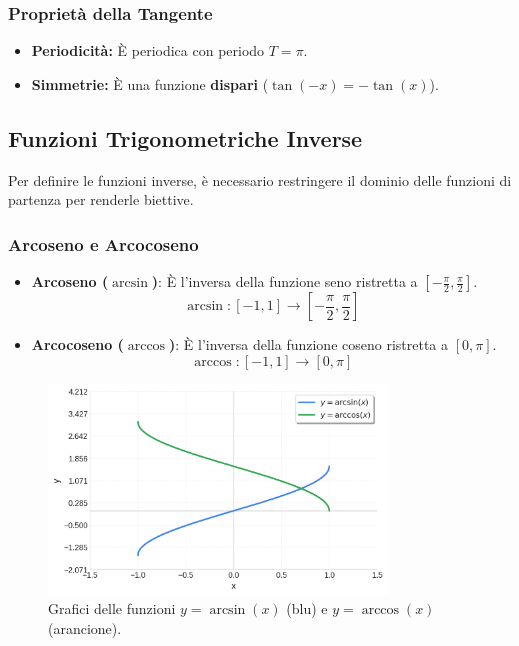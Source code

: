 \subsubsection{Proprietà della Tangente}
\begin{itemize}
    \item \textbf{Periodicità:} È periodica con periodo \(T = \pi\).
    \item \textbf{Simmetrie:} È una funzione \textbf{dispari} (\(\tan(-x) = -\tan(x)\)).
\end{itemize}

\subsection{Funzioni Trigonometriche Inverse}
Per definire le funzioni inverse, è necessario restringere il dominio delle funzioni di partenza per renderle biettive.

\subsubsection{Arcoseno e Arcocoseno}
\begin{itemize}
    \item \textbf{Arcoseno (\(\arcsin\))}: È l'inversa della funzione seno ristretta a \(\left[-\frac{\pi}{2}, \frac{\pi}{2}\right]\).
    \[ \arcsin: [-1, 1] \rightarrow \left[-\frac{\pi}{2}, \frac{\pi}{2}\right] \]
    \item \textbf{Arcocoseno (\(\arccos\))}: È l'inversa della funzione coseno ristretta a \([0, \pi]\).
    \[ \arccos: [-1, 1] \rightarrow [0, \pi] \]
\end{itemize}

\begin{figure}[H]
    \centering
    \includegraphics[width=0.8\textwidth]{./img/arcsin_arccos_grafici.png}
    \caption{Grafici delle funzioni \(y=\arcsin(x)\) (blu) e \(y=\arccos(x)\) (arancione).}
    \label{fig:arcsin_arccos_grafici}
\end{figure}
\FloatBarrier

